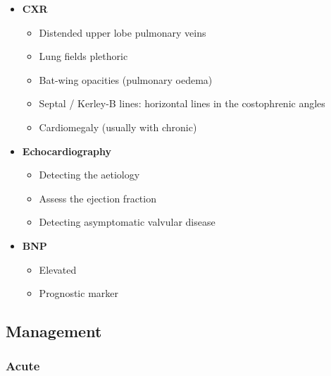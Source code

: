 \documentclass[
  12pt,
]{memoir}
\providecommand{\tightlist}{%
  \setlength{\itemsep}{0pt}\setlength{\parskip}{0pt}}
\begin{document}
\begin{itemize}
\tightlist
\item
  \textbf{CXR}

  \begin{itemize}
  \tightlist
  \item
    Distended upper lobe pulmonary veins
  \item
    Lung fields plethoric
  \item
    Bat-wing opacities (pulmonary oedema)
  \item
    Septal / Kerley-B lines: horizontal lines in the costophrenic angles
  \item
    Cardiomegaly (usually with chronic)
  \end{itemize}
\item
  \textbf{Echocardiography}

  \begin{itemize}
  \tightlist
  \item
    Detecting the aetiology
  \item
    Assess the ejection fraction
  \item
    Detecting asymptomatic valvular disease
  \end{itemize}
\item
  \textbf{BNP}

  \begin{itemize}
  \tightlist
  \item
    Elevated
  \item
    Prognostic marker
  \end{itemize}
\end{itemize}

\hypertarget{management-4}{%
\subsection{Management}\label{management-4}}

\hypertarget{acute}{%
\subsubsection{Acute}\label{acute}}
\end{document}
